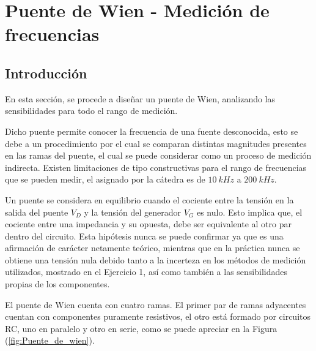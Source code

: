 


\section{Puente de Wien - Medición de frecuencias}

\subsection{Introducción}

En esta sección, se procede a diseñar un puente de Wien, analizando las sensibilidades para todo el rango de medición.

Dicho puente permite conocer la frecuencia de una fuente desconocida, esto se debe a un procedimiento por el cual se comparan distintas magnitudes presentes en las ramas del puente, el cual se puede considerar como un proceso de medición indirecta. Existen limitaciones de tipo constructivas para el rango de frecuencias que se pueden medir, el asignado por la cátedra es de $10 \ kHz$ a $200 \ kHz$.

Un puente se considera en equilibrio cuando el cociente entre la tensión en la salida del puente $V_D$ y la tensión del generador $V_G$ es nulo. Esto implica que, el cociente entre una impedancia y su opuesta, debe ser equivalente al otro par dentro del circuito. Esta hipótesis nunca se puede confirmar ya que es una afirmación de carácter netamente teórico, mientras que en la práctica nunca se obtiene una tensión nula debido tanto a la incerteza en los métodos de medición utilizados, mostrado en el Ejercicio 1, así como también a las sensibilidades propias de los componentes.

El puente de Wien cuenta con cuatro ramas. El primer par de ramas adyacentes cuentan con componentes puramente resistivos, el otro está formado por circuitos RC, uno en paralelo y otro en serie, como se puede apreciar en la Figura (\ref{fig:Puente_de_wien}).

